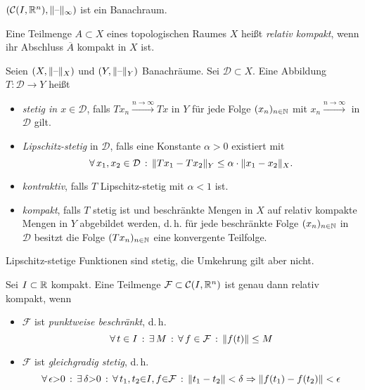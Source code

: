 \documentclass{cheat-sheet}
\begin{document}

\begin{bem}
  $(\mathcal{C}(I, \mathbb{R}^n), \lVert\text{--}\rVert_\infty)$ ist ein Banachraum.
\end{bem}

\begin{defn}
  Eine Teilmenge $A \subset X$ eines topologischen Raumes $X$ heißt \emph{relativ kompakt}, wenn ihr Abschluss $\overline{A}$ kompakt in $X$ ist.
\end{defn}

\begin{defn}
  Seien $(X, \lVert\text{--}\rVert_X)$ und $(Y, \lVert\text{--}\rVert_Y)$ Banachräume. Sei $\mathcal{D} \subset X$. Eine Abbildung $T : \mathcal{D} \to Y$ heißt
  \begin{itemize}
    \item \emph{stetig in $x \in \mathcal{D}$}, falls $T x_n \xrightarrow{n \to \infty} T x$ in $Y$ für jede Folge $(x_n)_{n \in \mathbb{N}}$ mit $x_n \xrightarrow{n \to \infty}$ in $\mathcal{D}$ gilt.
    \item \emph{Lipschitz-stetig} in $\mathcal{D}$, falls eine Konstante $\alpha > 0$ existiert mit
    \[ \forall \, {x_1, x_2 \in \mathcal{D}} \,:\, \lVert Tx_1 - Tx_2\rVert_Y \leq \alpha \cdot \lVert x_1 - x_2\rVert_X. \]
    \item \emph{kontraktiv}, falls $T$ Lipschitz-stetig mit $\alpha < 1$ ist.
    \item \emph{kompakt}, falls $T$ stetig ist und beschränkte Mengen in $X$ auf relativ kompakte Mengen in $Y$ abgebildet werden, d.\,h. für jede beschränkte Folge $(x_n)_{n \in \mathbb{N}}$ in $\mathcal{D}$ besitzt die Folge $(Tx_n)_{n \in \mathbb{N}}$ eine konvergente Teilfolge.
  \end{itemize}
\end{defn}

\begin{bem}
  Lipschitz-stetige Funktionen sind stetig, die Umkehrung gilt aber nicht.
\end{bem}


\begin{satz}
  Sei $I \subset \mathbb{R}$ kompakt. Eine Teilmenge $\mathcal{F} \subset \mathcal{C}(I, \mathbb{R}^n)$ ist genau dann relativ kompakt, wenn
  \begin{itemize}
    \item $\mathcal{F}$ ist \emph{punktweise beschränkt}, d.\,h.
    \[ \forall \, {t \in I} \,:\, \exists \, {M} \,:\, \forall \, {f \in \mathcal{F}} \,:\, \lVert f(t)\rVert \leq M \]
    \item $\mathcal{F}$ ist \emph{gleichgradig stetig}, d.\,h.
    \[ \forall \, {\epsilon {>} 0} \,:\, \exists \, {\delta {>} 0} \,:\, \forall \, {t_1, t_2 {\in} I, f {\in} \mathcal{F}} \,:\, \lVert t_1 - t_2\rVert < \delta \Rightarrow \lVert f(t_1) - f(t_2)\rVert < \epsilon \]
  \end{itemize}
\end{satz}
\end{document}

